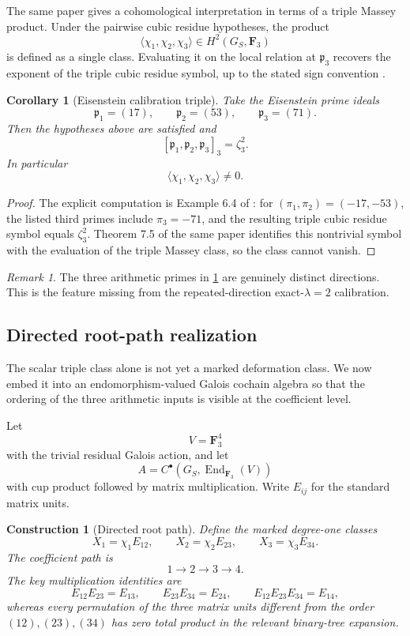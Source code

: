 \documentclass[11pt]{article}
\newtheorem{corollary}[theorem]{Corollary}
\newtheorem{construction}[theorem]{Construction}
\theoremstyle{remark}
\newtheorem{remark}[theorem]{Remark}
\newcommand{\F}{\mathbf F}
\providecommand{\End}{\operatorname{End}}
\begin{document}
The same paper gives a cohomological interpretation in terms of a triple Massey product.  Under the pairwise cubic residue hypotheses, the product
\[
 \langle\chi_1,\chi_2,\chi_3\rangle
 \in H^2(G_S,\F_3)
\]
is defined as a single class.  Evaluating it on the local relation at \(\mathfrak p_3\) recovers the exponent of the triple cubic residue symbol, up to the stated sign convention \cite[Theorem 7.5]{AMM}.

\begin{corollary}[Eisenstein calibration triple]\label{P1L-thm:amm-example}
Take the Eisenstein prime ideals
\[
 \mathfrak p_1=(17),\qquad
 \mathfrak p_2=(53),\qquad
 \mathfrak p_3=(71).
\]
Then the hypotheses above are satisfied and
\[
 [\mathfrak p_1,\mathfrak p_2,\mathfrak p_3]_3=\zeta_3^2.
\]
In particular
\[
 \langle\chi_1,\chi_2,\chi_3\rangle\neq0.
\]
\end{corollary}

\begin{proof}
The explicit computation is Example 6.4 of \cite{AMM}: for \((\pi_1,\pi_2)=(-17,-53)\), the listed third primes include \(\pi_3=-71\), and the resulting triple cubic residue symbol equals \(\zeta_3^2\).  Theorem 7.5 of the same paper identifies this nontrivial symbol with the evaluation of the triple Massey class, so the class cannot vanish.
\end{proof}

\begin{remark}
The three arithmetic primes in \cref{P1L-thm:amm-example} are genuinely distinct directions.  This is the feature missing from the repeated-direction exact-\(\lambda=2\) calibration.
\end{remark}


\subsection{Directed root-path realization}

The scalar triple class alone is not yet a marked deformation class.  We now embed it into an endomorphism-valued Galois cochain algebra so that the ordering of the three arithmetic inputs is visible at the coefficient level.

Let
\[
 V=\F_3^4
\]
with the trivial residual Galois action, and let
\[
 A=C^\bullet(G_S,\End_{\F_3}(V))
\]
with cup product followed by matrix multiplication.  Write \(E_{ij}\) for the standard matrix units.

\begin{construction}[Directed root path]\label{P1L-con:root-path}
Define the marked degree-one classes
\[
 X_1=\chi_1E_{12},\qquad
 X_2=\chi_2E_{23},\qquad
 X_3=\chi_3E_{34}.
\]
The coefficient path is
\[
 1\longrightarrow2\longrightarrow3\longrightarrow4.
\]
The key multiplication identities are
\[
 E_{12}E_{23}=E_{13},\qquad
 E_{23}E_{34}=E_{24},\qquad
 E_{12}E_{23}E_{34}=E_{14},
\]
whereas every permutation of the three matrix units different from the order \((12),(23),(34)\) has zero total product in the relevant binary-tree expansion.
\end{construction}
\end{document}
